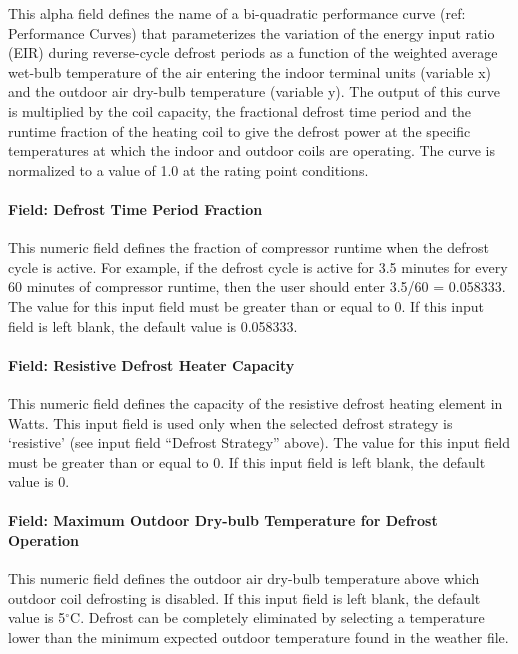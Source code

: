 This alpha field defines the name of a bi-quadratic performance curve (ref: Performance Curves) that parameterizes the variation of the energy input ratio (EIR) during reverse-cycle defrost periods as a function of the weighted average wet-bulb temperature of the air entering the indoor terminal units (variable x) and the outdoor air dry-bulb temperature (variable y). The output of this curve is multiplied by the coil capacity, the fractional defrost time period and the runtime fraction of the heating coil to give the defrost power at the specific temperatures at which the indoor and outdoor coils are operating. The curve is normalized to a value of 1.0 at the rating point conditions.

\paragraph{Field: Defrost Time Period Fraction}\label{field-defrost-time-period-fraction-1-000}

This numeric field defines the fraction of compressor runtime when the defrost cycle is active. For example, if the defrost cycle is active for 3.5 minutes for every 60 minutes of compressor runtime, then the user should enter 3.5/60 = 0.058333. The value for this input field must be greater than or equal to 0. If this input field is left blank, the default value is 0.058333.

\paragraph{Field: Resistive Defrost Heater Capacity}\label{field-resistive-defrost-heater-capacity-1-000}

This numeric field defines the capacity of the resistive defrost heating element in Watts. This input field is used only when the selected defrost strategy is `resistive' (see input field ``Defrost Strategy'' above). The value for this input field must be greater than or equal to 0. If this input field is left blank, the default value is 0.

\paragraph{Field: Maximum Outdoor Dry-bulb Temperature for Defrost Operation}\label{field-maximum-outdoor-dry-bulb-temperature-for-defrost-operation-1-000}

This numeric field defines the outdoor air dry-bulb temperature above which outdoor coil defrosting is disabled. If this input field is left blank, the default value is 5$^\circ$C. Defrost can be completely eliminated by selecting a temperature lower than the minimum expected outdoor temperature found in the weather file.

